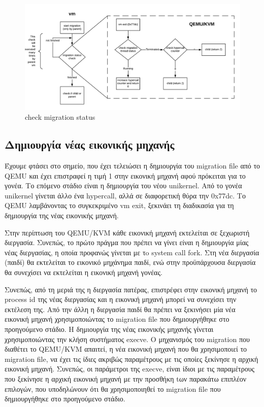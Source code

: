 \begin{figure}[htp]
\centerline{\includegraphics[scale=0.75]{figures/check_migration_status.png}}
\caption{check migration status\label{fig4_9}}
\end{figure}

\subsection{Δημιουργία νέας εικονικής μηχανής}

Έχουμε φτάσει στο σημείο, που έχει τελειώσει η δημιουργία του migration file από
το QEMU και έχει επιστραφεί η τιμή 1 στην εικονική μηχανή αφού πρόκειται για το
γονέα. Το επόμενο στάδιο είναι η δημιουργία του νέου unikernel. Από το γονέα
unikernel γίνεται άλλο ένα hypercall, αλλά σε διαφορετική θύρα την 0x77dc. Το
QEMU λαμβάνοντας το συγκεκριμένο vm exit, ξεκινάει τη διαδικασία για τη
δημιουργία της νέας εικονικής μηχανή. 

Στην περίπτωση του QEMU/KVM κάθε εικονική μηχανή εκτελείται σε ξεχωριστή
διεργασία. Συνεπώς, το πρώτο πράγμα που πρέπει να γίνει είναι η δημιουργία μίας
νέας διεργασίας, η οποία προφανώς γίνεται με τo system call fork. Στη νέα
διεργασία (παιδί) θα εκτελείται το εικονικό μηχάνημα παιδί, ενώ στην
προϋπάρχουσα διεργασία θα συνεχίσει να εκτελείται η εικονική μηχανή γονέας.

Συνεπώς, από τη μεριά της η διεργασία πατέρας, επιστρέφει στην εικονική μηχανή
το process id της νέας διεργασίας και η εικονική μηχανή μπορεί να συνεχίσει την
εκτέλεση της. Από την άλλη η διεργασία παιδί θα πρέπει να ξεκινήσει μία νέα
εικονική μηχανή χρησιμοποιώντας το migration file που δημιουργήθηκε στο
προηγούμενο στάδιο. Η δημιουργία της νέας εικονικής μηχανής γίνεται
χρησιμοποιώντας την κλήση συστήματος execve. Ο μηχανισμός του migration που
διαθέτει το QEMU/KVM απαιτεί, η νέα εικονική μηχανή που θα χρησιμοποιεί το
migration file, να έχει τις ίδιες ακριβώς παραμέτρους με τις οποίες ξεκίνησε η
αρχική εικονική μηχανή. Συνεπώς, οι παράμετροι της execve, είναι ίδιοι με τις
παραμέτρους που ξεκίνησε η αρχική εικονική μηχανή με την προσθήκη tων παρακάτω
επιπλέον επιλογών, που υποδηλώνουν ότι θα χρησιμοποιηθεί το migration file που
δημιουργήθηκε στο προηγούμενο στάδιο.

